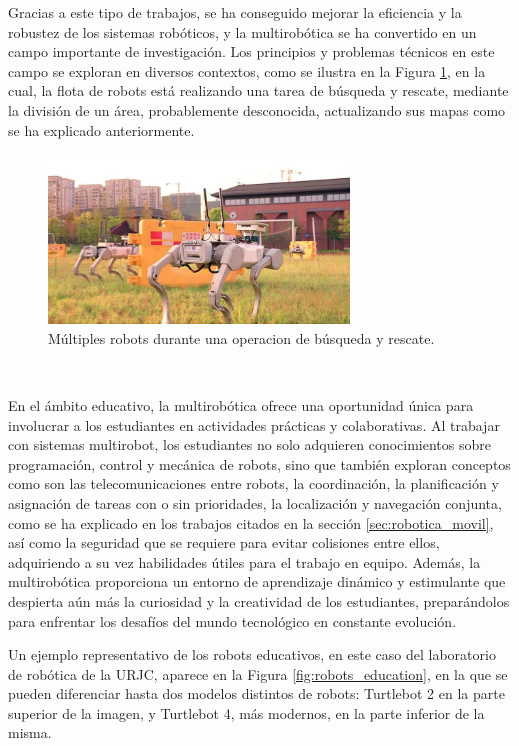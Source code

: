 Gracias a este tipo de trabajos, se ha conseguido mejorar la eficiencia y la
robustez de los sistemas robóticos, y la multirobótica se ha convertido en un
campo importante de investigación.
Los principios y problemas técnicos en este campo se exploran en diversos
contextos, como se ilustra en la Figura \ref{fig:multirobots}, en la cual, la
flota de robots está realizando una tarea de búsqueda y rescate, mediante la
división de un área, probablemente desconocida, actualizando sus mapas como
se ha explicado anteriormente.

\begin{figure} [h!]
  \begin{center}
    \includegraphics[width=8cm]{figs/multirobotics_in_search_and_rescue}
  \end{center}
  \caption{Múltiples robots durante una operacion de búsqueda y rescate.}
  \label{fig:multirobots}
\end{figure}\

En el ámbito educativo, la multirobótica ofrece una oportunidad única para
involucrar a los estudiantes en actividades prácticas y colaborativas.
Al trabajar con sistemas multirobot, los estudiantes no solo adquieren
conocimientos sobre programación, control y mecánica de robots, sino que también
exploran conceptos como son las telecomunicaciones entre robots, la coordinación,
la planificación y asignación de tareas con o sin prioridades, la localización y
navegación conjunta, como se ha explicado en los trabajos citados en la sección
\ref{sec:robotica_movil}, así como la seguridad que se requiere para evitar
colisiones entre ellos, adquiriendo a su vez habilidades útiles para el trabajo
en equipo.
Además, la multirobótica proporciona un entorno de aprendizaje dinámico y
estimulante que despierta aún más la curiosidad y la creatividad de los
estudiantes, preparándolos para enfrentar los desafíos del mundo tecnológico en
constante evolución.

Un ejemplo representativo de los robots educativos, en este caso del laboratorio
de robótica de la URJC, aparece en la Figura \ref{fig:robots_education}, en la
que se pueden diferenciar hasta dos modelos distintos de robots: Turtlebot 2 en
la parte superior de la imagen, y Turtlebot 4, más modernos, en la parte inferior
de la misma.

